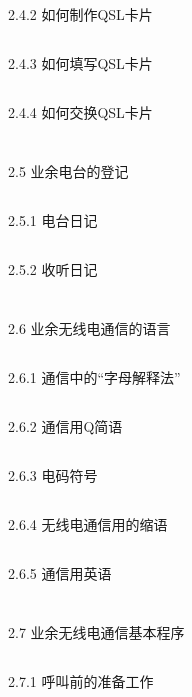 \documentclass[12pt,UTF8]{ctexbook}
\begin{document}
\subsection{}2.4.2 如何制作QSL卡片
\subsection{}2.4.3 如何填写QSL卡片
\subsection{}2.4.4 如何交换QSL卡片
\section{}2.5 业余电台的登记
\subsection{}2.5.1 电台日记
\subsection{}2.5.2 收听日记
\section{}2.6 业余无线电通信的语言
\subsection{}2.6.1 通信中的“字母解释法”
\subsection{}2.6.2 通信用Q简语
\subsection{}2.6.3 电码符号
\subsection{}2.6.4 无线电通信用的缩语
\subsection{}2.6.5 通信用英语
\section{}2.7 业余无线电通信基本程序
\subsection{}2.7.1 呼叫前的准备工作
\end{document}
